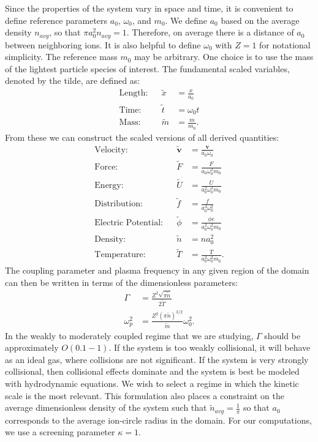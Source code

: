 \documentclass{article}
\begin{document}
Since the properties of the system vary in space and time, it is convenient to define reference parameters $a_0$, $\omega_0$, and $m_0$. We define $a_0$ based on the average density $n_{avg}$, so that $\pi a_0^2n_{avg}=1$. Therefore, on average there is a distance of $a_0$ between neighboring ions. It is also helpful to define $\omega_0$ with $Z=1$ for notational simplicity. The reference mass $m_0$ may be arbitrary. One choice is to use the mass of the lightest particle species of interest. The fundamental scaled variables, denoted by the tilde, are defined as:
\begin{align*}
\text{Length:}&			&\tilde{x} &= \frac{x}{a_0} 	\\
\text{Time:}&			&\tilde{t} &= \omega_0 t 	\\
\text{Mass:}&			&\tilde{m} &= \frac{m}{m_0}.
\end{align*}
From these we can construct the scaled versions of all derived quantities:
\begin{align*}
\text{Velocity:}&			&	\tilde{\mathbf{v}} 	 &= \frac{\mathbf{v}}{a_0\omega_0} 				\\
\text{Force:}&				&	\tilde{F} 	 &= \frac{F}{a_0\omega_0^2m_0}			\\
\text{Energy:}&				&	\tilde{U} 	 &= \frac{U}{a_0^2\omega_0^2m_0} 		\\
\text{Distribution:}& 		&	\tilde{f} 	 &= \frac{f}{a_0^4\omega_0^2}			\\
\text{Electric Potential:}& &	\tilde{\phi} &= \frac{\phi e}{a_0^2\omega_0^2m_0}	\\
\text{Density:}&			&	\tilde{n}	 &= na_0^2								\\
\text{Temperature:}&        &	\tilde{T}	 &= \frac{T}{a_0^2\omega_0^2m_0}.
\end{align*}
The coupling parameter and plasma frequency in any given region of the domain can then be written in terms of the dimensionless parameters:
\begin{align}
\Gamma&=\frac{Z^2\sqrt{\pi\tilde{n}}}{2\tilde{T}}\\
\omega_p^2&=\frac{Z^2(\pi\tilde{n})^{3/2}}{\tilde{m}}\omega_0^2.
\end{align}
In the weakly to moderately coupled regime that we are studying, $\Gamma$ should be approximately $O(0.1-1)$. If the system is too weakly collisional, it will behave as an ideal gas, where collisions are not significant. If the system is very strongly collisional, then collisional effects dominate and the system is best be modeled with hydrodynamic equations. We wish to select a regime in which the kinetic scale is the most relevant. This formulation also places a constraint on the average dimensionless density of the system such that $\tilde{n}_{avg}=\frac{1}{\pi}$ so that $a_0$ corresponds to the average ion-circle radius in the domain. For our computations, we use a screening parameter $\kappa=1$.
\end{document}
